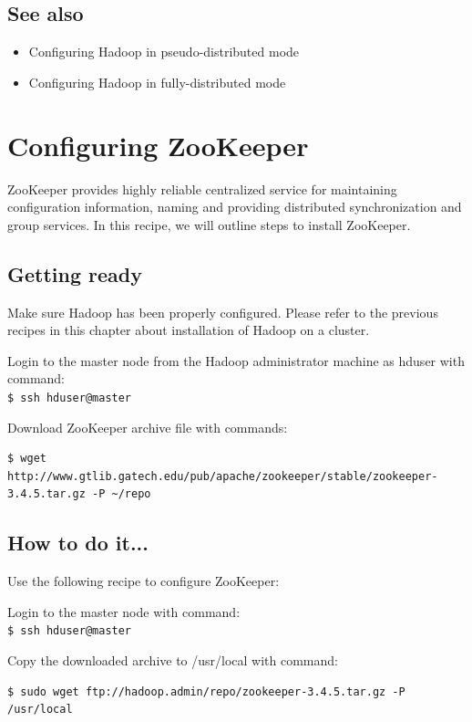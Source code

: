 \subsection*{See also}
\begin{itemize}
\item Configuring Hadoop in pseudo-distributed mode
\item Configuring Hadoop in fully-distributed mode
\end{itemize}

\section{Configuring ZooKeeper}
ZooKeeper provides highly reliable centralized service for maintaining configuration information, naming and providing distributed synchronization and group services. In this recipe, we will outline steps to install ZooKeeper.

\subsection*{Getting ready}
Make sure Hadoop has been properly configured. Please refer to the previous recipes in this chapter about installation of Hadoop on a cluster.

Login to the master node from the Hadoop administrator machine as hduser with command: \\
\verb|$ ssh hduser@master|

Download ZooKeeper archive file with commands:
\lstset{style=bashstyle}
\begin{lstlisting}
$ wget http://www.gtlib.gatech.edu/pub/apache/zookeeper/stable/zookeeper-3.4.5.tar.gz -P ~/repo
\end{lstlisting}

\subsection*{How to do it...}
Use the following recipe to configure ZooKeeper:

Login to the master node with command: \\
\verb|$ ssh hduser@master|

Copy the downloaded archive to /usr/local with command: 
\lstset{style=bashstyle}
\begin{lstlisting}
$ sudo wget ftp://hadoop.admin/repo/zookeeper-3.4.5.tar.gz -P /usr/local
\end{lstlisting}

